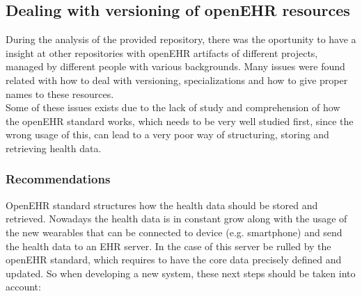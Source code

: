 \documentclass[mim_thesis.tex]{subfiles}
\begin{document}
\subsection{Dealing with versioning of openEHR resources}

During the analysis of the provided repository, there was the oportunity to have a insight at other repositories with openEHR artifacts of different projects, managed by different people with various backgrounds. Many issues were found related with how to deal with versioning, specializations and how to give proper names to these resources. \\ 

Some of these issues exists due to the lack of study and comprehension of how the openEHR standard works, which needs to be very well studied first, since the wrong usage of this, can lead to a very poor way of structuring, storing and retrieving health data. \\


\subsubsection{Recommendations}
OpenEHR standard structures how the health data should be stored and retrieved. Nowadays the health data is in constant grow along with the usage of the new wearables that can be connected to device (e.g. smartphone) and send the health data to an EHR server. In the case of this server be rulled by the openEHR standard, which requires to have the core data precisely defined and updated. So when developing a new system, these next steps should be taken into account:
\end{document}
